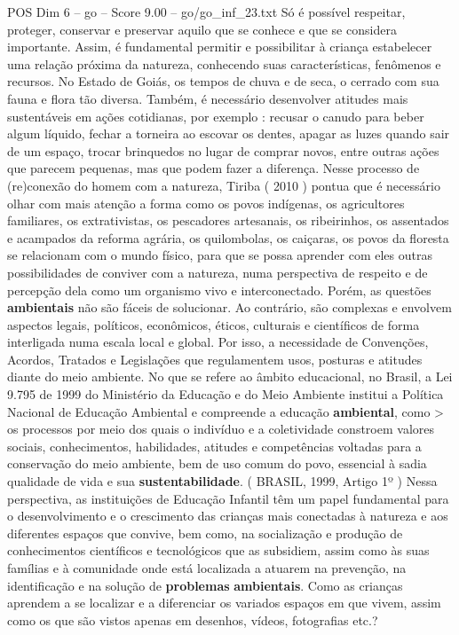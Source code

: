 \begin{textsample}{POS Dim 6 – go – Score 9.00 – go/go\_inf\_23.txt}
Só é possível respeitar, proteger, conservar e preservar aquilo que se conhece e que se considera importante.
Assim, é fundamental permitir e possibilitar à criança estabelecer uma relação próxima da natureza, conhecendo suas características, fenômenos e recursos.
No Estado de Goiás, os tempos de chuva e de seca, o cerrado com sua fauna e flora tão diversa.
Também, é necessário desenvolver atitudes mais sustentáveis em ações cotidianas, por exemplo : recusar o canudo para beber algum líquido, fechar a torneira ao escovar os dentes, apagar as luzes quando sair de um espaço, trocar brinquedos no lugar de comprar novos, entre outras ações que parecem pequenas, mas que podem fazer a diferença.
Nesse processo de (re)conexão do homem com a natureza, Tiriba ( 2010 ) pontua que é necessário olhar com mais atenção a forma como os povos indígenas, os agricultores familiares, os extrativistas, os pescadores artesanais, os ribeirinhos, os assentados e acampados da reforma agrária, os quilombolas, os caiçaras, os povos da floresta se relacionam com o mundo físico, para que se possa aprender com eles outras possibilidades de conviver com a natureza, numa perspectiva de respeito e de percepção dela como um organismo vivo e interconectado.
Porém, as questões \textbf{ambientais} não são fáceis de solucionar.
Ao contrário, são complexas e envolvem aspectos legais, políticos, econômicos, éticos, culturais e científicos de forma interligada numa escala local e global.
Por isso, a necessidade de Convenções, Acordos, Tratados e Legislações que regulamentem usos, posturas e atitudes diante do meio ambiente.
No que se refere ao âmbito educacional, no Brasil, a Lei 9.795 de 1999 do Ministério da Educação e do Meio Ambiente institui a Política Nacional de Educação Ambiental e compreende a educação \textbf{ambiental}, como > os processos por meio dos quais o indivíduo e a coletividade constroem valores sociais, conhecimentos, habilidades, atitudes e competências voltadas para a conservação do meio ambiente, bem de uso comum do povo, essencial à sadia qualidade de vida e sua \textbf{sustentabilidade}. ( BRASIL, 1999, Artigo 1º ) Nessa perspectiva, as instituições de Educação Infantil têm um papel fundamental para o desenvolvimento e o crescimento das crianças mais conectadas à natureza e aos diferentes espaços que convive, bem como, na socialização e produção de conhecimentos científicos e tecnológicos que as subsidiem, assim como às suas famílias e à comunidade onde está localizada a atuarem na prevenção, na identificação e na solução de \textbf{problemas} \textbf{ambientais}.
Como as crianças aprendem a se localizar e a diferenciar os variados espaços em que vivem, assim como os que são vistos apenas em desenhos, vídeos, fotografias etc.?

\end{textsample}
